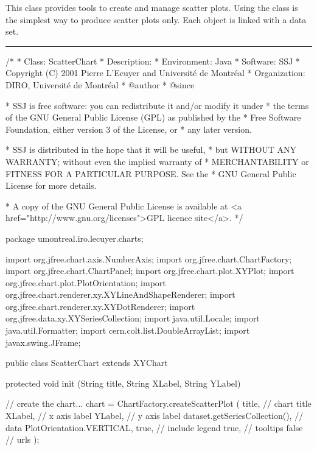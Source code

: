 
This class provides tools to create and manage scatter plots. Using the
 class is the simplest way to produce scatter plots only.
Each  object is linked with a
 data set.

\bigskip\hrule
\begin{code}
\begin{hide}
/*
 * Class:        ScatterChart
 * Description:  
 * Environment:  Java
 * Software:     SSJ 
 * Copyright (C) 2001  Pierre L'Ecuyer and Université de Montréal
 * Organization: DIRO, Université de Montréal
 * @author       
 * @since

 * SSJ is free software: you can redistribute it and/or modify it under
 * the terms of the GNU General Public License (GPL) as published by the
 * Free Software Foundation, either version 3 of the License, or
 * any later version.

 * SSJ is distributed in the hope that it will be useful,
 * but WITHOUT ANY WARRANTY; without even the implied warranty of
 * MERCHANTABILITY or FITNESS FOR A PARTICULAR PURPOSE.  See the
 * GNU General Public License for more details.

 * A copy of the GNU General Public License is available at
   <a href="http://www.gnu.org/licenses">GPL licence site</a>.
 */
\end{hide}
package umontreal.iro.lecuyer.charts;\begin{hide}

import   org.jfree.chart.axis.NumberAxis;
import   org.jfree.chart.ChartFactory;
import   org.jfree.chart.ChartPanel;
import   org.jfree.chart.plot.XYPlot;
import   org.jfree.chart.plot.PlotOrientation;
import   org.jfree.chart.renderer.xy.XYLineAndShapeRenderer;
import   org.jfree.chart.renderer.xy.XYDotRenderer;
import   org.jfree.data.xy.XYSeriesCollection;
import   java.util.Locale;
import   java.util.Formatter;
import   cern.colt.list.DoubleArrayList;
import   javax.swing.JFrame;
\end{hide}

public class ScatterChart extends XYChart \begin{hide} {

   protected void init (String title, String XLabel, String YLabel) {
      // create the chart...
      chart = ChartFactory.createScatterPlot (
         title,                    // chart title
         XLabel,                   // x axis label
         YLabel,                   // y axis label
         dataset.getSeriesCollection(), // data
         PlotOrientation.VERTICAL,
         true,                     // include legend
         true,                     // tooltips
         false                     // urls
      );

}}
\end{hide}
\end{code}
